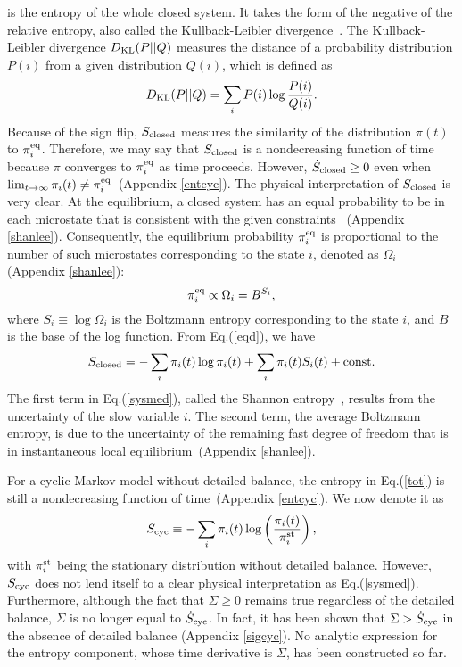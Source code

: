 \documentclass[aps,pre,amsmath,amssymb,floatfix,preprint,nofootinbib]{revtex4}
\begin{document}
is the entropy of the whole closed system. 
It takes the form of the negative of the relative entropy, also called the Kullback-Leibler divergence~\cite{KL}. The Kullback-Leibler divergence $D_{\rm KL}(P||Q)$ measures the distance of a probability distribution $P(i)$ from a given distribution $Q(i)$, which is defined as
\begin{equation}
D_{\rm KL}(P||Q)=\sum_i P(i) \log \frac{P(i)}{Q(i)}.
\end{equation}
 Because of the sign flip, $S_{\rm closed}$  measures the similarity of the distribution $\pi(t)$ to $\pi^{\rm eq}_i$. Therefore, we may say that $S_{\rm closed}$ is a nondecreasing function of time because $\pi$ converges to $\pi^{\rm eq}_i$ as time proceeds. However, $\dot S_{\rm closed} \ge 0$ even when $\lim_{t \to \infty} \pi_i(t) \ne \pi^{\rm eq}_i$~(Appendix \ref{entcyc}). The physical interpretation of $S_{\rm closed}$ is very clear. At the equilibrium, a closed system has an equal probability to be in each microstate that is consistent with the given constraints~\cite{lee,tolman} (Appendix \ref{shanlee}). Consequently, the equilibrium probability $\pi^{\rm eq}_i$ is proportional to the number of such microstates corresponding to the state $i$, denoted as $\Omega_i$~\cite{lee} (Appendix \ref{shanlee}):
 \begin{equation}
 \pi^{\rm eq}_i \propto \Omega_i = B^{S_i}, \label{eqd}
 \end{equation}
 where $S_i \equiv \log \Omega_i$ is the Boltzmann entropy corresponding to the state $i$, and $B$ is the base of the log function. From Eq.(\ref{eqd}), we have
\begin{equation}
 S_{\rm closed} =  -\sum_i \pi_i(t) \log \pi_i(t) + \sum_i \pi_i(t) S_i(t)    + {\rm const}. \label{sysmed}
\end{equation}
The first term in Eq.(\ref{sysmed}), called the Shannon entropy~\cite{rmp,shannon}, results from the uncertainty of the slow variable $i$. The second term, the average Boltzmann entropy, is due to the uncertainty of the remaining fast degree of freedom that is in instantaneous local equilibrium~(Appendix \ref{shanlee}).

For a cyclic Markov model without detailed balance, the entropy in Eq.(\ref{tot}) is still a nondecreasing function of time~(Appendix \ref{entcyc}). We now denote it as
\begin{equation}
S_{\rm cyc} \equiv -\sum_i \pi_i(t) \log \left(\frac{\pi_i(t)}{\pi^{\rm st}_i}\right), \label{scy}
\end{equation} 
with $\pi^{\rm st}_i$ being the stationary distribution without detailed balance. However, $S_{\rm cyc}$ does not lend itself to a clear physical interpretation as Eq.(\ref{sysmed}). Furthermore, although the fact that $\Sigma \ge 0$ remains true regardless of the detailed balance, $\Sigma$ is no longer equal to $\dot S_{\rm cyc}$. In fact, it has been shown that $\Sigma > \dot S_{\rm cyc}$\cite{hg,gq} in the absence of detailed balance (Appendix \ref{sigcyc}). No analytic expression for the entropy component, whose time derivative is $\Sigma$, has been constructed so far.
\end{document}
